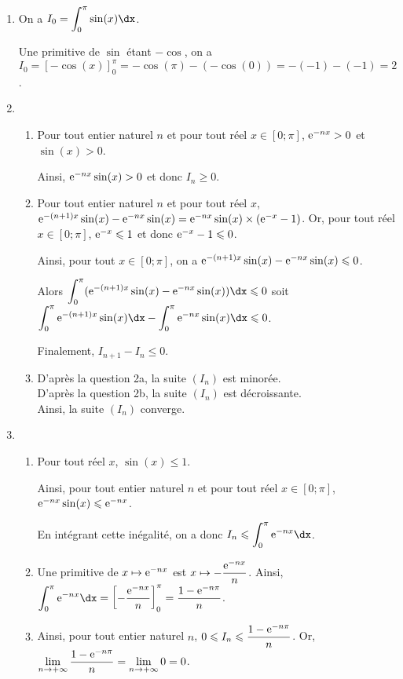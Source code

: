 \documentclass[11pt,fleqn, openany]{book} %
\begin{document}
\begin{solution}\hspace{0pt}


\begin{enumerate}
\item On a $I_0=\displaystyle\int_0^{\pi}\sin(x)\dx$. 

Une primitive de $\sin$ étant $-\cos$, on a $I_0=[-\cos(x)]_0^{\pi}=-\cos(\pi)-(-\cos(0))=-(-1)-(-1)=2$.
\item \begin{enumerate}
\vskip5pt
\item Pour tout entier naturel $n$ et pour tout réel $x \in [0; \pi]$, $\mathrm{e}^{-nx}>0$ et $\sin(x)>0$. 

Ainsi, $\mathrm{e}^{-nx}\sin(x)>0$ et donc $I_n \geqslant 0$.
\vskip5pt
\item Pour tout entier naturel $n$ et pour tout réel $x$, $\mathrm{e}^{-(n+1)x}\sin(x)-\mathrm{e}^{-nx}\sin(x)=\mathrm{e}^{-nx}\sin(x) \times(\mathrm{e}^{-x}-1)$. Or, pour tout réel $x\in[0;\pi]$, $\mathrm{e}^{-x} \leqslant 1$ et donc $\mathrm{e}^{-x}-1 \leqslant 0$.

Ainsi, pour tout $x \in [0;\pi]$, on a $\mathrm{e}^{-(n+1)x}\sin(x)-\mathrm{e}^{-nx}\sin(x)\leqslant 0$. 

Alors $\displaystyle\int_0^{\pi}(\e^{-(n+1)x}\sin(x)-\e^{-nx}\sin(x))\dx\leqslant 0$ soit $\displaystyle\int_0^{\pi}\e^{-(n+1)x}\sin(x)\dx-\int_0^{\pi}\e^{-nx}\sin(x)\dx\leqslant 0$. 

Finalement, $I_{n+1}-I_n \leqslant 0$.
\vskip5pt
\item D'après la question 2a, la suite $(I_n)$ est minorée. \\D'après la question 2b, la suite $(I_n)$ est décroissante.\\ Ainsi, la suite $(I_n)$ converge.\end{enumerate}

\item \begin{enumerate}
\item Pour tout réel $x$, $\sin(x)\leqslant 1$. 

Ainsi, pour tout entier naturel $n$ et pour tout réel $x\in[0;\pi]$, $\mathrm{e}^{-nx}\sin(x) \leqslant \mathrm{e}^{-nx}$. 

En intégrant cette inégalité, on a donc $I_n \leqslant \displaystyle\int_0^{\pi} \e^{-nx}\dx$.
\vskip5pt
\item Une primitive de $x\mapsto \mathrm{e}^{-nx}$ est $x\mapsto -\dfrac{\mathrm{e}^{-nx}}{n}$. Ainsi, $\displaystyle\int_0^{\pi} \e^{-nx}\dx=\left[ -\dfrac{\e^{-nx}}{n}\right]_0^{\pi}=\dfrac{1-\e^{-n\pi}}{n}$.
\vskip5pt
\item Ainsi, pour tout entier naturel $n$, $0 \leqslant I_n \leqslant \dfrac{1-\mathrm{e}^{-n\pi}}{n}$. Or, $\displaystyle\lim_{n \to +\infty} \dfrac{1-\mathrm{e}^{-n\pi}}{n} = \displaystyle\lim_{n \to + \infty}0=0$. 


\end{enumerate}
\end{enumerate}
\end{solution}
\end{document}
